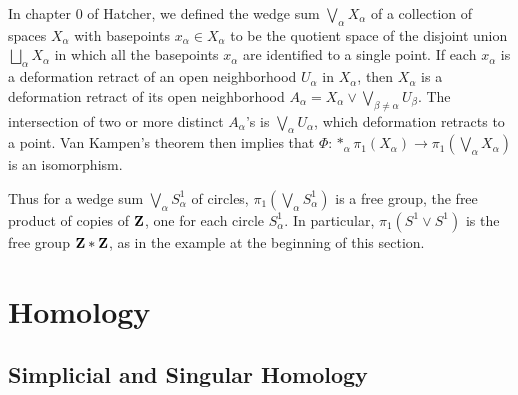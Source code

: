 \begin{example}
In chapter 0 of Hatcher, we defined the wedge sum $\bigvee_\alpha X_\alpha$
of a collection of spaces $X_\alpha$ with basepoints $x_\alpha\in X_\alpha$
to be the quotient space of the disjoint union $\bigsqcup_\alpha X_\alpha$
in which all the basepoints $x_\alpha$ are identified to a single point. If
each $x_\alpha$ is a deformation retract of an open neighborhood $U_\alpha$
in $X_\alpha$, then $X_\alpha$ is a deformation retract of its open
neighborhood $A_\alpha=X_\alpha\vee\bigvee_{\beta\neq\alpha}U_\beta$. The
intersection of two or more distinct $A_\alpha$'s is $\bigvee_\alpha
U_\alpha$, which deformation retracts to a point. Van Kampen's theorem then
implies that
$\Phi\colon\ast_\alpha\pi_1(X_\alpha)\to\pi_1\left(\bigvee_\alpha
  X_\alpha\right)$ is an isomorphism.

Thus for a wedge sum $\bigvee_\alpha S^1_\alpha$ of circles,
$\pi_1\left(\bigvee_\alpha S^1_\alpha\right)$ is a free group, the free
product of copies of $\mathbf{Z}$, one for each circle $S^1_\alpha$. In
particular, $\pi_1\left(S^1\vee S^1\right)$ is the free group $\mathbf{Z}*\mathbf{Z}$,
as in the example at the beginning of this section.
\end{example}

\begin{example}[Hatcher 1.22]

\end{example}

\section{Homology}
\subsection{Simplicial and Singular Homology}
